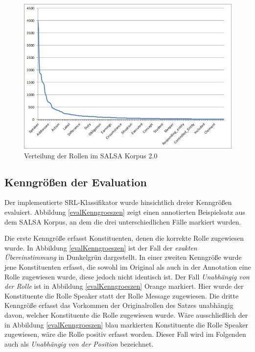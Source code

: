 \documentclass[12pt]{article}
\begin{document}
	\begin{figure}[tb!]
		\centering
		\includegraphics[scale=0.6]{images/roleFrequency.jpg}
		\caption{Verteilung der Rollen im SALSA Korpus 2.0}
		\label{roleFrequency}
	\end{figure}


\subsection{Kenngrößen der Evaluation}

Der implementierte SRL-Klassifikator wurde hinsichtlich dreier Kenngrößen evaluiert. Abbildung \ref{evalKenngroeszen} zeigt einen annotierten Beispielsatz aus dem SALSA Korpus, an dem die drei unterschiedlichen Fälle markiert wurden.

Die erste Kenngröße erfasst Konstituenten, denen die korrekte Rolle zugewiesen wurde. In Abbildung \ref{evalKenngroeszen} ist der Fall der \textit{exakten Übereinstimmung} in Dunkelgrün dargestellt. 
In einer zweiten Kenngröße wurde jene Konstituenten erfasst, die sowohl im Original als auch in der Annotation eine Rolle zugewiesen wurde, diese jedoch nicht identisch ist. Der Fall \textit{Unabhängig von der Rolle} ist in Abbildung \ref{evalKenngroeszen} Orange markiert. Hier wurde der Konstituente die Rolle Speaker statt der Rolle Message zugewiesen.
Die dritte Kenngröße erfasst das Vorkommen der Originalrollen des Satzes unabhängig davon, welcher Konstituente die Rolle zugewiesen wurde. Wäre ausschließlich der in Abbildung \ref{evalKenngroeszen} blau markierten Konstituente die Rolle Speaker zugewiesen, wäre die Rolle positiv erfasst worden. Dieser Fall wird im Folgenden auch als \textit{Unabhängig von der Position} bezeichnet.
\end{document}
